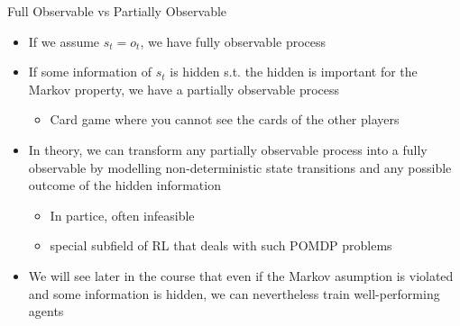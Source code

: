 \begin{frame}[c]{Full Observable vs Partially Observable}
	
	\begin{itemize}
		\item If we assume $s_t = o_t$, we have fully observable process
		\pause
		\item If some information of $s_t$ is hidden s.t. the hidden is important for the Markov property, we have a partially observable process
		\begin{itemize}
			\item Card game where you cannot see the cards of the other players
		\end{itemize}
		\pause
		\medskip
		\item In theory, we can transform any partially observable process into a fully observable by modelling non-deterministic state transitions and any possible outcome of the hidden information
		\begin{itemize}
			\item In partice, often infeasible
			\item special subfield of RL that deals with such POMDP problems
		\end{itemize}
		\pause
		\medskip
		\item We will see later in the course that even if the Markov asumption is violated and some information is hidden, we can nevertheless train well-performing agents
	\end{itemize}

\end{frame}

